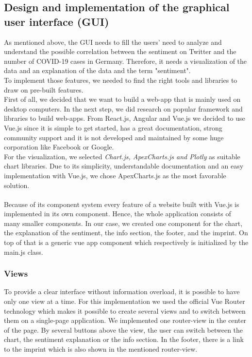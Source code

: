 \documentclass[
    fontsize=12pt,
    headings=small,
    parskip=half,           %
    bibliography=totoc,
    numbers=noenddot,       %
    open=any,               %
    ]{scrreprt}
\begin{document}
\subsection{Design and implementation of the graphical user interface (GUI)}
As mentioned above, the GUI needs to fill the users' need to analyze and understand the possible correlation between the sentiment on Twitter and the number of COVID-19 cases in Germany. Therefore, it needs a visualization of the data and an explanation of the data and the term "sentiment".\\
To implement those features, we needed to find the right tools and libraries to draw on pre-built features. \\
First of all, we decided that we want to build a web-app that is mainly used on desktop computers. In the next step, we did research on popular framework and libraries to build web-apps. From React.js, Angular and Vue.js we decided to use Vue.js since it is simple to get started, has a great documentation, strong community support and it is not developed and maintained by some huge corporation like Facebook or Google.\\
For the visualization, we selected \textit{Chart.js, ApexCharts.js and Plotly} as suitable chart libraries. Due to its simplicity, understandable documentation and an easy implementation with Vue.js, we chose ApexCharts.js as the most favorable solution. \\
\\
Because of its component system every feature of a website built with Vue.js is implemented in its own component. Hence, the whole application consists of many smaller components. In our case, we created one component for the chart, the explanation of the sentiment, the info section, the footer, and the imprint. On top of that is a generic vue app component which respectively is initialized by the main.js class. \\

\subsubsection*{Views}
To provide a clear interface without information overload, it is  possible to have only one view at a time. For this implementation we used the official Vue Router technology which makes it possible to create several views and to switch between them on a single-page application. We implemented one router-view in the center of the page. By several buttons above the view, the user can switch between the chart, the sentiment explanation or the info section. In the footer, there is a link to the imprint which is also shown in the mentioned router-view.
\end{document}
